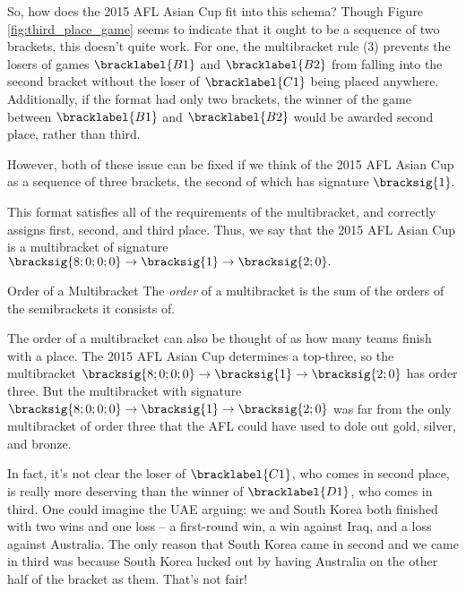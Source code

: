 {    So, how does the 2015 AFL Asian Cup fit into this schema? Though Figure \ref{fig:third_place_game} seems to indicate that it ought to be a sequence of two brackets, this doesn't quite work. For one, the multibracket rule (3) prevents the losers of games $\bracklabel{B1}$ and $\bracklabel{B2}$ from falling into the second bracket without the loser of $\bracklabel{C1}$ being placed anywhere. Additionally, if the format had only two brackets, the winner of the game between $\bracklabel{B1}$ and $\bracklabel{B2}$ would be awarded second place, rather than third.

    However, both of these issue can be fixed if we think of the 2015 AFL Asian Cup as a sequence of three brackets, the second of which has signature $\bracksig{1}.$


    This format satisfies all of the requirements of the multibracket, and correctly assigns first, second, and third place. Thus, we say that the 2015 AFL Asian Cup is a multibracket of signature $\bracksig{8;0;0;0} \to \bracksig{1} \to \bracksig{2;0}.$ 

    \begin{definition}{Order of a Multibracket}{}
        The \textit{order} of a multibracket is the sum of the orders of the semibrackets it consists of.
    \end{definition}

    The order of a multibracket can also be thought of as how many teams finish with a place. The 2015 AFL Asian Cup determines a top-three, so the multibracket $\bracksig{8;0;0;0} \to \bracksig{1} \to \bracksig{2;0}$ has order three.  
    But the multibracket with signature $\bracksig{8;0;0;0} \to \bracksig{1} \to \bracksig{2;0}$ was far from the only multibracket of order three that the AFL could have used to dole out gold, silver, and bronze.
    
    In fact, it's not clear the loser of $\bracklabel{C1}$, who comes in second place, is really more deserving than the winner of $\bracklabel{D1}$, who comes in third. One could imagine the UAE arguing: we and South Korea both finished with two wins and one loss -- a first-round win, a win against Iraq, and a loss against Australia. The only reason that South Korea came in second and we came in third was because South Korea lucked out by having Australia on the other half of the bracket as them. That's not fair!

}
